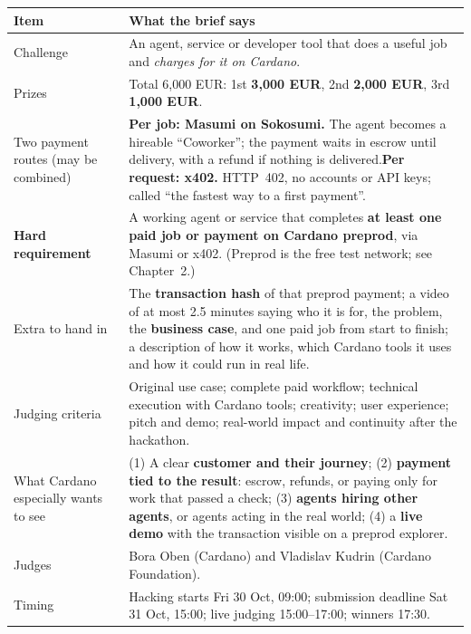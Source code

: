 \begin{center}
\small
\begin{tabularx}{\textwidth}{@{}p{3.4cm}X@{}}
\toprule
\textbf{Item} & \textbf{What the brief says} \\
\midrule
Challenge & An agent, service or developer tool that does a useful job and \emph{charges for it on Cardano}. \\
Prizes & Total 6,000 EUR: 1st \textbf{3,000 EUR}, 2nd \textbf{2,000 EUR}, 3rd \textbf{1,000 EUR}. \\
Two payment routes (may be combined) & \textbf{Per job: Masumi on Sokosumi.} The agent becomes a hireable ``Coworker''; the payment waits in escrow until delivery, with a refund if nothing is delivered.\newline \textbf{Per request: x402.} HTTP~402, no accounts or API keys; called ``the fastest way to a first payment''. \\
\textbf{Hard requirement} & A working agent or service that completes \textbf{at least one paid job or payment on Cardano preprod}, via Masumi or x402. (Preprod is the free test network; see Chapter~2.) \\
Extra to hand in & The \textbf{transaction hash} of that preprod payment; a video of at most 2.5 minutes saying who it is for, the problem, the \textbf{business case}, and one paid job from start to finish; a description of how it works, which Cardano tools it uses and how it could run in real life. \\
Judging criteria & Original use case; complete paid workflow; technical execution with Cardano tools; creativity; user experience; pitch and demo; real-world impact and continuity after the hackathon. \\
What Cardano especially wants to see & (1) A clear \textbf{customer and their journey}; (2) \textbf{payment tied to the result}: escrow, refunds, or paying only for work that passed a check; (3) \textbf{agents hiring other agents}, or agents acting in the real world; (4) a \textbf{live demo} with the transaction visible on a preprod explorer. \\
Judges & Bora Oben (Cardano) and Vladislav Kudrin (Cardano Foundation). \\
Timing & Hacking starts Fri 30 Oct, 09:00; submission deadline Sat 31 Oct, 15:00; live judging 15:00--17:00; winners 17:30. \\
\bottomrule
\end{tabularx}
\end{center}

